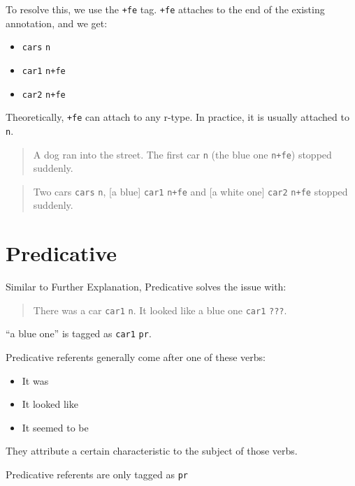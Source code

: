 \documentclass[
]{book}
\providecommand{\tightlist}{%
  \setlength{\itemsep}{0pt}\setlength{\parskip}{0pt}}
\begin{document}
To resolve this, we use the \texttt{+fe} tag.
\texttt{+fe} attaches to the end of the existing annotation, and we get:

\begin{itemize}
\tightlist
\item
  \texttt{cars} \texttt{n}
\item
  \texttt{car1} \texttt{n+fe}
\item
  \texttt{car2} \texttt{n+fe}
\end{itemize}

Theoretically, \texttt{+fe} can attach to any r-type. In practice, it is usually attached to \texttt{n}.

\begin{quote}
A dog ran into the street. The first car \texttt{n} (the blue one \texttt{n+fe}) stopped suddenly.
\end{quote}

\begin{quote}
Two cars \texttt{cars} \texttt{n}, {[}a blue{]} \texttt{car1} \texttt{n+fe} and {[}a white one{]} \texttt{car2} \texttt{n+fe} stopped suddenly.
\end{quote}

\hypertarget{predicative}{%
\section{Predicative}\label{predicative}}

Similar to Further Explanation, Predicative solves the issue with:

\begin{quote}
There was a car \texttt{car1} \texttt{n}. It looked like a blue one \texttt{car1} \texttt{???}.
\end{quote}

``a blue one'' is tagged as \texttt{car1} \texttt{pr}.

Predicative referents generally come after one of these verbs:

\begin{itemize}
\tightlist
\item
  It was
\item
  It looked like
\item
  It seemed to be
\end{itemize}

They attribute a certain characteristic to the subject of those verbs.

Predicative referents are only tagged as \texttt{pr}
\end{document}
